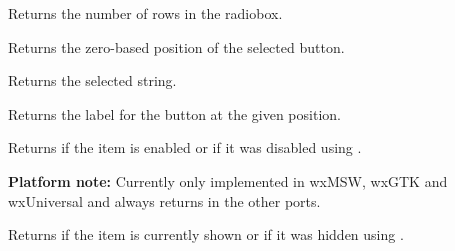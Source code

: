 

\label{wxradioboxgetrowcount}


Returns the number of rows in the radiobox.


\label{wxradioboxgetselection}


Returns the zero-based position of the selected button.


\label{wxradioboxgetstringselection}


Returns the selected string.


\label{wxradioboxgetstring}


Returns the label for the button at the given position.




\label{wxradioboxisitemenabled}


Returns \true if the item is enabled or \false if it was disabled using 
.

{\bf Platform note:} Currently only implemented in wxMSW, wxGTK and wxUniversal
and always returns \true in the other ports.


\label{wxradioboxisitemshown}


Returns \true if the item is currently shown or \false if it was hidden using 
.

